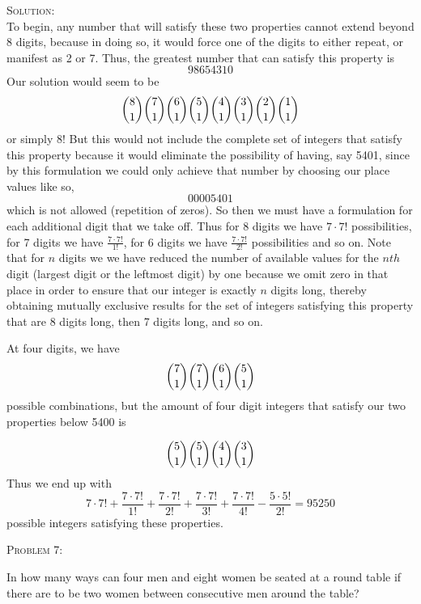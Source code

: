 \documentclass[12pt,oneside]{article}
\newenvironment{problem}[1]
{\begin{mdframed}
        \textsc{Problem #1:}

		}
		    {\end{mdframed}}
\newenvironment{solution}
			    {\textsc{Solution:}\\}
				    {\newpage}
\begin{document}
						\begin{solution}
						To begin, any number that will satisfy these two properties cannot extend beyond 8 digits, because in doing so, it would force one of the digits to either repeat, or manifest as 2 or 7.  Thus, the greatest number that can satisfy this property is
						\[98654310\]
						Our solution would seem to be
						\[\dbinom{8}{1}\dbinom{7}{1}\dbinom{6}{1}\dbinom{5}{1}\dbinom{4}{1}\dbinom{3}{1}\dbinom{2}{1}\dbinom{1}{1}\]
						or simply $8!$
						But this would not include the complete set of integers that satisfy this property because it would eliminate the possibility of having, say 5401, since by this formulation we could only achieve that number by choosing our place values like so,
						\[00005401\]
						which is not allowed (repetition of zeros). 
						So then we must have a formulation for each additional digit that we take off.
						Thus for 8 digits we have $7\cdot7!$ possibilities, for 7 digits we have $\frac{7\cdot7!}{1!}$, for 6 digits we have $\frac{7\cdot7!}{2!}$ possibilities and so on. Note that for $n$ digits we we have reduced the number of available values for the $nth$ digit (largest digit or the leftmost digit) by one because we omit zero in that place in order to ensure that our integer is exactly $n$ digits long, thereby obtaining mutually exclusive results for the set of integers satisfying this property that are 8 digits long, then 7 digits long, and so on. 

						At four digits, we have 
						\[\dbinom{7}{1}\dbinom{7}{1}\dbinom{6}{1}\dbinom{5}{1}\]
						possible combinations, but the amount of four digit integers that satisfy our two properties below 5400 is

						\[\dbinom{5}{1}\dbinom{5}{1}\dbinom{4}{1}\dbinom{3}{1}\]
						Thus we end up with 
						\[7\cdot7!+\frac{7\cdot7!}{1!}+\frac{7\cdot7!}{2!}+\frac{7\cdot7!}{3!}+\frac{7\cdot7!}{4!}-\frac{5\cdot5!}{2!}=95250\]
						possible integers satisfying these properties.






						\end{solution}

						\begin{problem}{7}

						In how many ways can four men and eight women be seated at a round table if there are to be two women between consecutive men around the table?

						\end{problem}
\end{document}
